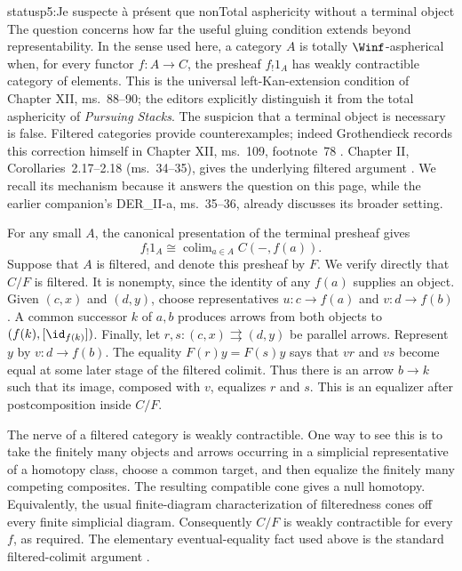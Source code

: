 \begin{dcomment}{status}{p5:Je suspecte à présent que non}{Total asphericity without a terminal object}
The question concerns how far the useful gluing condition extends beyond representability. In the sense used here, a category \(A\) is totally \(\Winf\)-aspherical when, for every functor \(f:A\to C\), the presheaf \(f_!1_A\) has weakly contractible category of elements. This is the universal left-Kan-extension condition of Chapter XII, ms.~88--90; the editors explicitly distinguish it from the total asphericity of \emph{Pursuing Stacks}. The suspicion that a terminal object is necessary is false. Filtered categories provide counterexamples; indeed Grothendieck records this correction himself in Chapter XII, ms.~109, footnote~78 \citep{Grothendieck1990XII}. Chapter II, Corollaries~2.17--2.18 (ms.~34--35), gives the underlying filtered argument \citep{Grothendieck1990II}. We recall its mechanism because it answers the question on this page, while the earlier companion's DER\_II-a, ms.~35--36, already discusses its broader setting.

For any small \(A\), the canonical presentation of the terminal presheaf gives
\[
  f_!1_A\cong\mathop{\mathrm{colim}}_{a\in A}C(-,f(a)).
\]
Suppose that \(A\) is filtered, and denote this presheaf by \(F\). We verify directly that \(C/F\) is filtered. It is nonempty, since the identity of any \(f(a)\) supplies an object. Given \((c,x)\) and \((d,y)\), choose representatives \(u:c\to f(a)\) and \(v:d\to f(b)\). A common successor \(k\) of \(a,b\) produces arrows from both objects to \((f(k),[\id_{f(k)}])\). Finally, let \(r,s:(c,x)\rightrightarrows(d,y)\) be parallel arrows. Represent \(y\) by \(v:d\to f(b)\). The equality \(F(r)y=F(s)y\) says that \(vr\) and \(vs\) become equal at some later stage of the filtered colimit. Thus there is an arrow \(b\to k\) such that its image, composed with \(v\), equalizes \(r\) and \(s\). This is an equalizer after postcomposition inside \(C/F\).

The nerve of a filtered category is weakly contractible. One way to see this is to take the finitely many objects and arrows occurring in a simplicial representative of a homotopy class, choose a common target, and then equalize the finitely many competing composites. The resulting compatible cone gives a null homotopy. Equivalently, the usual finite-diagram characterization of filteredness cones off every finite simplicial diagram. Consequently \(C/F\) is weakly contractible for every \(f\), as required. The elementary eventual-equality fact used above is the standard filtered-colimit argument \citep[\S4.19]{StacksFiltered}.


\end{dcomment}
